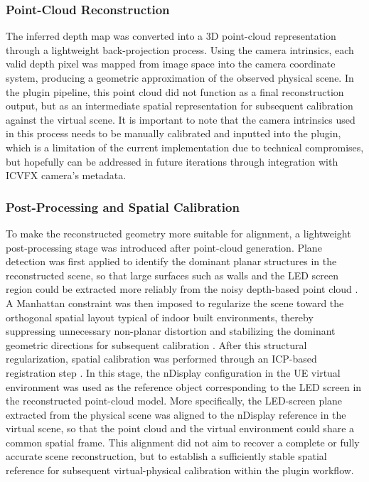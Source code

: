 \documentclass[conference]{IEEEtran}
\begin{document}
\subsubsection{Point-Cloud Reconstruction}
The inferred depth map was converted into a 3D point-cloud representation through a lightweight back-projection process. Using the camera intrinsics, each valid depth pixel was mapped from image space into the camera coordinate system, producing a geometric approximation of the observed physical scene. In the plugin pipeline, this point cloud did not function as a final reconstruction output, but as an intermediate spatial representation for subsequent calibration against the virtual scene. It is important to note that the camera intrinsics used in this process needs to be manually calibrated and inputted into the plugin, which is a limitation of the current implementation due to technical compromises, but hopefully can be addressed in future iterations through integration with ICVFX camera's metadata.

\subsubsection{Post-Processing and Spatial Calibration}
To make the reconstructed geometry more suitable for alignment, a lightweight post-processing stage was introduced after point-cloud generation. Plane detection was first applied to identify the dominant planar structures in the reconstructed scene, so that large surfaces such as walls and the LED screen region could be extracted more reliably from the noisy depth-based point cloud \cite{Zhong2022PlaneSeg}. A Manhattan constraint was then imposed to regularize the scene toward the orthogonal spatial layout typical of indoor built environments, thereby suppressing unnecessary non-planar distortion and stabilizing the dominant geometric directions for subsequent calibration \cite{Guo2022Manhattan}. After this structural regularization, spatial calibration was performed through an ICP-based registration step \cite{Besl1992ICP}. In this stage, the nDisplay configuration in the UE virtual environment was used as the reference object corresponding to the LED screen in the reconstructed point-cloud model. More specifically, the LED-screen plane extracted from the physical scene was aligned to the nDisplay reference in the virtual scene, so that the point cloud and the virtual environment could share a common spatial frame. This alignment did not aim to recover a complete or fully accurate scene reconstruction, but to establish a sufficiently stable spatial reference for subsequent virtual-physical calibration within the plugin workflow.
\end{document}
